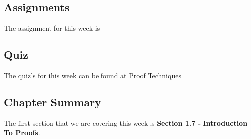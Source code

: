 \subsection{Assignments}

The assignment for this week is   

\subsection{Quiz}

The quiz's for this week can be found at \href{https://applied.cs.colorado.edu/mod/quiz/view.php?id=51597}{Proof Techniques} \textbullet {}  

\subsection{Chapter Summary}

The first section that we are covering this week is \textbf{Section 1.7 - Introduction To Proofs}.


